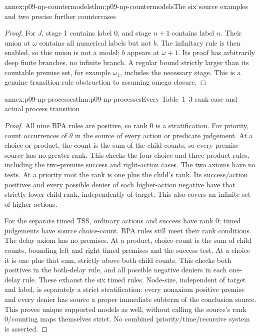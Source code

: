 \begin{annexitem}{annex:p09-np-countermodels}{thm:p09-np-countermodels}{The six source examples and two precise further countercases}
\begin{proof}
For \(J\), stage 1 contains label 0, and stage \(n+1\) contains
label \(n\). Their union at \(\omega\) contains all numerical
labels but not \(b\). The infinitary rule is then enabled, so
this union is not a model; \(b\) appears at \(\omega+1\).
Its proof has arbitrarily deep finite branches, no infinite branch.
A regular bound strictly larger than its countable premise set,
for example \(\omega_1\), includes the necessary stage. This
is a genuine transition-rule obstruction to assuming omega closure.
\end{proof}
\end{annexitem}

\begin{annexitem}{annex:p09-np-processes}{thm:p09-np-processes}{Every Table~1--3 rank case and actual process transition}
\begin{proof}
All nine BPA rules are positive, so rank 0 is a stratification.
For priority, count occurrences of \(\theta\) in the source
of every action or predicate judgement. At a choice or product,
the count is the sum of the child counts, so every premise source
has no greater rank. This checks the four choice and three product
rules, including the two-premise success and right-action cases.
The two axioms have no tests. At a priority root the rank is one
plus the child's rank. Its success/action positives and every
possible denier of each higher-action negative have that strictly
lower child rank, independently of target. This also covers an
infinite set of higher actions.

For the separate timed TSS, ordinary actions and success have rank 0;
timed judgements have source choice-count. BPA rules still meet
their rank conditions. The delay axiom has no premises. At a
product, choice-count is the sum of child counts, bounding left
and right timed premises and the success test. At a choice it is
one plus that sum, strictly above both child counts. This checks
both positives in the both-delay rule, and all possible negative
deniers in each one-delay rule. These exhaust the six timed rules.
Node-size, independent of target and label, is separately a strict
stratification: every nonaxiom positive premise and every denier
has source a proper immediate subterm of the conclusion source.
This proves unique supported models as well, without calling the
source's rank 0/counting maps themselves strict. No combined
priority/time/recursive system is asserted.


\end{proof}
\end{annexitem}
